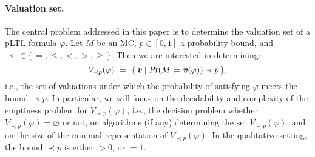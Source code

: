 \documentclass{llncs}
\renewcommand{\Pr}{\mbox{\rm Pr}}
\renewcommand{\Pr}{\mbox{\sl Pr}}
\newcommand{\set}[1]{\{ \, #1 \, \}}
\renewcommand{\leq}{\leqslant}
\renewcommand{\geq}{\geqslant}
\renewcommand{\emptyset}{\varnothing}
\renewcommand{\a}[1]{\textbf{\textit{#1}}}
\newcommand{\ve}{{{\a v}}}
\begin{document}
\paragraph{Valuation set.}
The central problem addressed in this paper is to determine the valuation set of a pLTL formula $\varphi$.
Let $M$ be an MC, $p \in [0,1]$ a probability bound, and $\prec \, \in \set{=, \leq , <, >, \geq}$. Then we are interested in determining:
$$
V_{\prec p}(\varphi) \ = \ \set{\ve \mid \Pr (M \models{\a v}(\varphi)) \prec p},
$$
i.e., the set of valuations under which the probability of satisfying $\varphi$ meets the bound $\prec p$.
In particular, we will focus on the decidability and complexity of the emptiness problem for $V_{\prec p}(\varphi)$, i.e., 
the decision problem whether $V_{\prec p}(\varphi) = \emptyset$ or not,  on algorithms (if any) determining the set $V_{\prec p}(\varphi)$, 
and on the size of the minimal representation of $V_{\prec p}(\varphi)$.
In the qualitative setting, the bound $\prec p$ is either $> 0$, or $= 1$.
\end{document}
